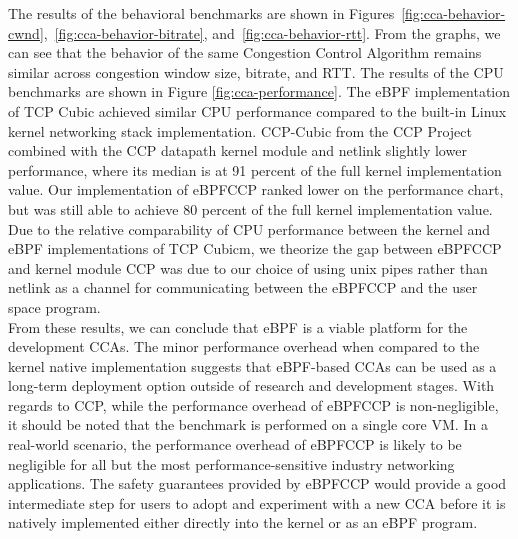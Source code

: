 \documentclass[../main.tex]{subfiles}
\begin{document}
The results of the behavioral benchmarks are shown in Figures~\ref{fig:cca-behavior-cwnd},~\ref{fig:cca-behavior-bitrate}, and~\ref{fig:cca-behavior-rtt}. From the graphs, we can see that the behavior of the same Congestion Control Algorithm remains similar across congestion window size, bitrate, and RTT. The results of the CPU benchmarks are shown in Figure \ref{fig:cca-performance}. The eBPF implementation of TCP Cubic achieved similar CPU performance compared to the built-in Linux kernel networking stack implementation. CCP-Cubic from the CCP Project \cite{generic-cong-avoid} combined with the CCP datapath kernel module and netlink slightly lower performance, where its median is at 91 percent of the full kernel implementation value. Our implementation of eBPFCCP ranked lower on the performance chart, but was still able to achieve 80 percent of the full kernel implementation value. Due to the relative comparability of CPU performance between the kernel and eBPF implementations of TCP Cubicm, we theorize the gap between eBPFCCP and kernel module CCP was due to our choice of using unix pipes rather than netlink as a channel for communicating between the eBPFCCP and the user space program. \\
From these results, we can conclude that eBPF is a viable platform for the development CCAs. The minor performance overhead when compared to the kernel native implementation suggests that eBPF-based CCAs can be used as a long-term deployment option outside of research and development stages. With regards to CCP, while the performance overhead of eBPFCCP is non-negligible, it should be noted that the benchmark is performed on a single core VM. In a real-world scenario, the performance overhead of eBPFCCP is likely to be negligible for all but the most performance-sensitive industry networking applications. The safety guarantees provided by eBPFCCP would provide a good intermediate step for users to adopt and experiment with a new CCA before it is natively implemented either directly into the kernel or as an eBPF program. 
\end{document}
